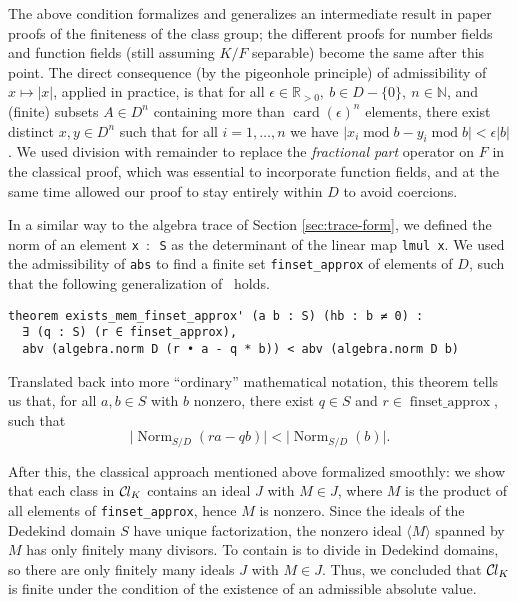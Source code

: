 \documentclass[sn-mathphys]{sn-jnl}%
\newcommand{\lean}[1]{\texttt{#1}\xspace}
\newcommand*{\Cl}{\mathcal{C}\kern-.075em l}
\newcommand{\N}{\mathbb{N}}
\renewcommand{\R}{\mathbb{R}}
\begin{document}
The above condition formalizes and generalizes an intermediate result in paper proofs of the finiteness of the class group;
the different proofs for number fields and function fields (still assuming $K/F$ separable) become the same after this point.
The direct consequence (by the pigeonhole principle) of admissibility of $x \mapsto \lvert x \rvert $, applied in practice,
is that for all $\epsilon \in \R_{>0},\ b \in D-\{0\},\ n \in \N$, and (finite) subsets $A \in D^n$ containing more than $\operatorname{card}(\epsilon)^n$ elements, there exist distinct $x,y \in D^n$ such that for all $i=1, \ldots, n$ we have $\lvert x_i \operatorname{mod} b - y_i \operatorname{mod}  b \rvert <\epsilon  \lvert b \rvert$.
We used division with remainder to replace the \emph{fractional part} operator on $F$ in the classical proof, which was essential to incorporate function fields, and at the same time allowed our proof to stay entirely within $D$ to avoid coercions.

In a similar way to the algebra trace of Section \ref{sec:trace-form}, we defined the norm of an element \lean{x $:$ S} as the determinant of the linear map \lean{lmul x}.
We used the admissibility of \lean{abs} to find a finite set \lean{finset\_approx} of elements of $D$,
such that the following generalization of~\cite[Theorem~12.2.1]{Ireland-Rosen} holds.
\begin{lstlisting}
theorem exists_mem_finset_approx' (a b : S) (hb : b ≠ 0) :
  ∃ (q : S) (r ∈ finset_approx),
  abv (algebra.norm D (r • a - q * b)) < abv (algebra.norm D b)
\end{lstlisting}
Translated back into more ``ordinary'' mathematical notation, this theorem tells us that, for all $a, b \in S$ with $b$ nonzero, there exist $q \in S$ and $r \in \operatorname{finset\_approx}$, such that
\[\lvert \operatorname{Norm}_{S/D}(ra-qb)\rvert < \lvert \operatorname{Norm}_{S/D}(b) \rvert.\]

After this, the classical approach mentioned above formalized smoothly:
we show that each class in $\Cl_{K}$ contains an ideal $J$ with $M \in J$,
where $M$ is the product of all elements of \lean{finset\_approx}, hence $M$ is nonzero.
Since the ideals of the Dedekind domain $S$ have unique factorization,
the nonzero ideal $\langle M \rangle$ spanned by $M$ has only finitely many divisors.
To contain is to divide in Dedekind domains, so there are only finitely many ideals $J$ with $M \in J$.
Thus, we concluded that $\Cl_{K}$ is finite under the condition of the existence of an admissible absolute value.
\end{document}

